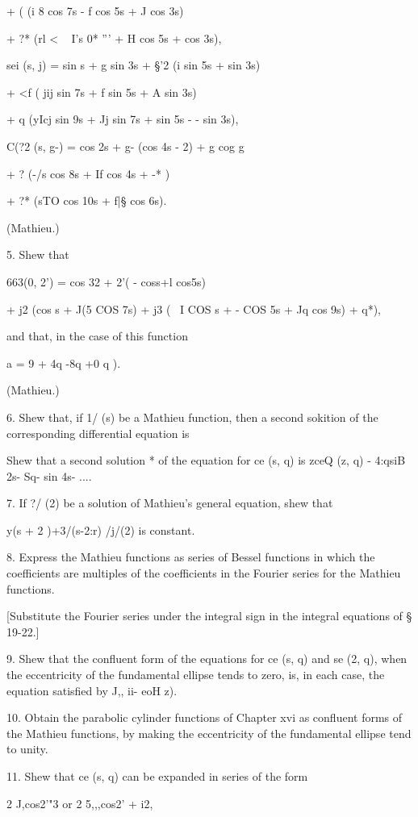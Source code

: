 {{+ ( (i 8 cos 7s - f cos 5s + J cos 3s)

+ ?* (rl < ~ I's 0* ''' + H cos 5s + cos 3s),

sei (s, j) = sin s + g sin 3s + §'2 (i sin 5s + sin 3s)

+ <f ( jij sin 7s + f sin 5s + A sin 3s)

+ q (yIcj sin 9s + Jj sin 7s + sin 5s - - sin 3s),

C(?2 (s, g-) = cos 2s + g- (cos 4s - 2) + g cog g

+ ? (-/s cos 8s + If cos 4s + -* )

+ ?* (sTO cos 10s + f|§ cos 6s).

(Mathieu.)

5. Shew that

663(0, 2') = cos 32 + 2'( - coss+l cos5s)

+ j2 (cos s + J(5 COS 7s) + j3 ( \ I COS s + - COS 5s + Jq cos 9s) +
q*),

and that, in the case of this function

a = 9 + 4q -8q +0 q ).

(Mathieu.)

6. Shew that, if 1/ (s) be a Mathieu function, then a second sokition
of the corresponding differential equation is

Shew that a second solution * of the equation for ce (s, q) is zceQ
(z, q) - 4:qsiB 2s- Sq- sin 4s- ....

7. If ?/ (2) be a solution of Mathieu's general equation, shew that

 y(s + 2 )+3/(s-2:r) /j/(2) is constant.

8. Express the Mathieu functions as series of Bessel functions in
which the coefficients are multiples of the coefficients in the
Fourier series for the Mathieu functions.

[Substitute the Fourier series under the integral sign in the integral
equations of § 19-22.]

9. Shew that the confluent form of the equations for ce (s, q) and se
(2, q), when the eccentricity of the fundamental ellipse tends to
zero, is, in each case, the equation satisfied by J,, ii- eoH z).

10. Obtain the parabolic cylinder functions of Chapter xvi as
confluent forms of the Mathieu functions, by making the eccentricity
of the fundamental ellipse tend to unity.

11. Shew that ce (s, q) can be expanded in series of the form

2 J,cos2'"3 or 2 5,,,cos2' + i2,

}}
